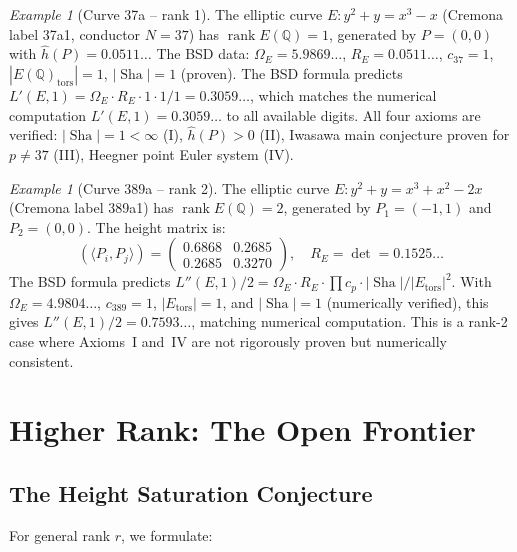 \documentclass[aps,prd,twocolumn,superscriptaddress,nofootinbib]{revtex4-2}
\theoremstyle{definition}
\theoremstyle{remark}
\newtheorem{example}[theorem]{Example}
\DeclareMathOperator{\rank}{rank}
\DeclareMathOperator{\Sha}{Sha}
\begin{document}
\begin{example}[Curve 37a -- rank 1]
\label{ex:37a}
The elliptic curve $E: y^2 + y = x^3 - x$ (Cremona label 37a1, conductor $N = 37$) has $\rank E(\mathbb{Q}) = 1$, generated by $P = (0,0)$ with $\hat{h}(P) = 0.0511\ldots$ The BSD data: $\Omega_E = 5.9869\ldots$, $R_E = 0.0511\ldots$, $c_{37} = 1$, $|E(\mathbb{Q})_{\mathrm{tors}}| = 1$, $|\Sha| = 1$ (proven). The BSD formula predicts $L'(E,1) = \Omega_E \cdot R_E \cdot 1 \cdot 1/1 = 0.3059\ldots$, which matches the numerical computation $L'(E,1) = 0.3059\ldots$ to all available digits. All four axioms are verified: $|\Sha| = 1 < \infty$ (I), $\hat{h}(P) > 0$ (II), Iwasawa main conjecture proven for $p \neq 37$ (III), Heegner point Euler system (IV).
\end{example}

\begin{example}[Curve 389a -- rank 2]
\label{ex:389a}
The elliptic curve $E: y^2 + y = x^3 + x^2 - 2x$ (Cremona label 389a1) has $\rank E(\mathbb{Q}) = 2$, generated by $P_1 = (-1,1)$ and $P_2 = (0,0)$. The height matrix is:
\[
\left(\langle P_i, P_j \rangle\right) = \begin{pmatrix} 0.6868 & 0.2685 \\ 0.2685 & 0.3270 \end{pmatrix}, \quad R_E = \det = 0.1525\ldots
\]
The BSD formula predicts $L''(E,1)/2 = \Omega_E \cdot R_E \cdot \prod c_p \cdot |\Sha|/|E_{\mathrm{tors}}|^2$. With $\Omega_E = 4.9804\ldots$, $c_{389} = 1$, $|E_{\mathrm{tors}}| = 1$, and $|\Sha| = 1$ (numerically verified), this gives $L''(E,1)/2 = 0.7593\ldots$, matching numerical computation. This is a rank-2 case where Axioms~I and~IV are not rigorously proven but numerically consistent.
\end{example}


\section{Higher Rank: The Open Frontier}
\label{sec:higher_rank}

\subsection{The Height Saturation Conjecture}

For general rank $r$, we formulate:
\end{document}
